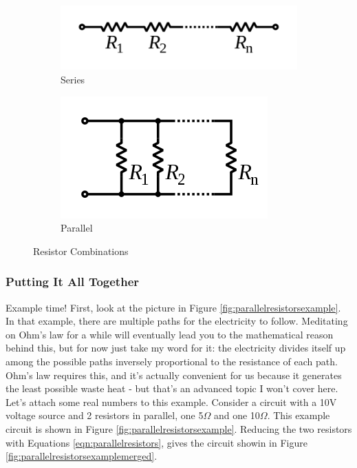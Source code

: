 \begin{figure}
\centering
\begin{subfigure}{.5\textwidth}
  \centering
\includegraphics[width=\textwidth]{seriesresistors.png}
  \caption{Series}
  \label{fig:seriesresistors}
\end{subfigure}%
\begin{subfigure}{.5\textwidth}
  \centering
\includegraphics[width=.5\textwidth]{parallelresistors.png}
  \caption{Parallel}
  \label{fig:parallelresistors}
\end{subfigure}
\caption{Resistor Combinations}
\label{fig:resistorscombinations}
\end{figure}


\subsubsection{Putting It All Together}

Example time! First, look at the picture in Figure \ref{fig:parallelresistorsexample}. In that example, there are multiple paths for the electricity to follow. Meditating on Ohm's law for a while will eventually lead you to the mathematical reason behind this, but for now just take my word for it: the electricity divides itself up among the possible paths inversely proportional to the resistance of each path. Ohm's law requires this, and it's actually convenient for us because it generates the least possible waste heat - but that's an advanced topic I won't cover here. Let's attach some real numbers to this example. Consider a circuit with a 10V voltage source and 2 resistors in parallel, one 5$\Omega$ and one 10$\Omega$. This example circuit is shown in Figure \ref{fig:parallelresistorsexample}. Reducing the two resistors with Equations \ref{eqn:parallelresistors}, gives the circuit showin in Figure \ref{fig:parallelresistorsexamplemerged}.


